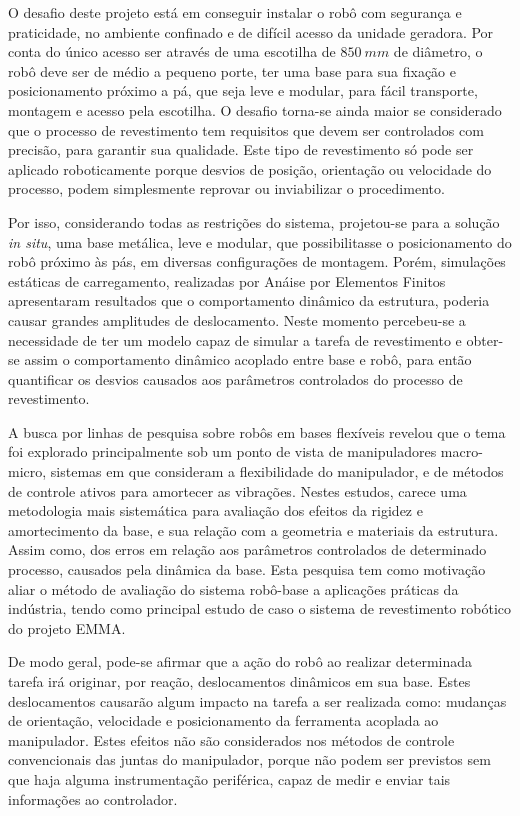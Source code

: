 O desafio deste projeto está em conseguir instalar o robô com segurança e
praticidade, no ambiente confinado e de difícil acesso da unidade geradora. Por
conta do único acesso ser através de uma escotilha de $850~mm$ de diâmetro, o
robô deve ser de médio a pequeno porte, ter uma base para sua fixação e
posicionamento próximo a pá, que seja leve e modular, para fácil transporte,
montagem e acesso pela escotilha. O desafio torna-se ainda maior se considerado
que o processo de revestimento tem requisitos que devem ser controlados com
precisão, para garantir sua qualidade. Este tipo de revestimento só pode ser
aplicado roboticamente porque desvios de posição, orientação ou velocidade do
processo, podem simplesmente reprovar ou inviabilizar o procedimento.

Por isso, considerando todas as restrições do sistema, projetou-se para a
solução \textit{in situ}, uma base metálica, leve e modular, que possibilitasse
o posicionamento do robô próximo às pás, em diversas configurações de montagem.
Porém, simulações estáticas de carregamento, realizadas por Anáise por Elementos
Finitos apresentaram resultados que o comportamento dinâmico da estrutura,
poderia causar grandes amplitudes de deslocamento.
Neste momento percebeu-se a necessidade de ter um modelo capaz de simular a
tarefa de revestimento e obter-se assim o comportamento dinâmico acoplado entre
base e robô, para então quantificar os desvios causados aos parâmetros
controlados do processo de revestimento.

A busca por linhas de pesquisa sobre robôs em bases flexíveis revelou que o tema
foi explorado principalmente sob um ponto de vista de manipuladores macro-micro,
sistemas em que consideram a flexibilidade do manipulador, e de métodos de
controle ativos para amortecer as vibrações. Nestes estudos, carece uma
metodologia mais sistemática para avaliação dos efeitos da rigidez e
amortecimento da base, e sua relação com a geometria e materiais da estrutura.
Assim como, dos erros em relação aos parâmetros controlados de determinado
processo, causados pela dinâmica da base. Esta pesquisa tem como motivação aliar
o método de avaliação do sistema robô-base a aplicações práticas da indústria,
tendo como principal estudo de caso o sistema de revestimento robótico do
projeto EMMA.

De modo geral, pode-se afirmar que a ação do robô ao realizar
determinada tarefa irá originar, por reação, deslocamentos dinâmicos em sua
base. Estes deslocamentos causarão algum impacto na tarefa a ser realizada como:
mudanças de orientação, velocidade e posicionamento da ferramenta acoplada ao
manipulador. Estes efeitos não são considerados nos métodos de controle
convencionais das juntas do manipulador, porque não podem ser previstos sem que
haja alguma instrumentação periférica, capaz de medir e enviar tais informações
ao controlador.

